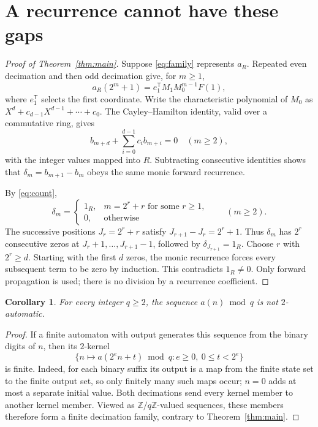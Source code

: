 \documentclass[11pt]{article}
\newtheorem{corollary}[theorem]{Corollary}
\newcommand{\Z}{\mathbb Z}
\begin{document}
\section{A recurrence cannot have these gaps}
\begin{proof}[Proof of Theorem~\ref{thm:main}]
Suppose \eqref{eq:family} represents $a_R$. Repeated even decimation
and then odd decimation give, for $m\ge1$,
\[
 a_R(2^m+1)=e_1^{\mathsf T}M_1M_0^{m-1}F(1),
\]
where $e_1^{\mathsf T}$ selects the first coordinate.
Write the characteristic polynomial of $M_0$ as
$X^d+c_{d-1}X^{d-1}+\cdots+c_0$.
The Cayley--Hamilton identity, valid over a commutative ring, gives
\begin{equation}\label{eq:recurrence}
 b_{m+d}+\sum_{i=0}^{d-1}c_i b_{m+i}=0\quad(m\ge2),
\end{equation}
with the integer values mapped into $R$.
Subtracting consecutive identities shows that
$\delta_m=b_{m+1}-b_m$ obeys the same monic forward recurrence.

By \eqref{eq:count},
\[
 \delta_m=
 \begin{cases}
  1_R,&m=2^r+r\text{ for some }r\ge1,\\
  0,&\text{otherwise}
 \end{cases}
 \qquad(m\ge2).
\]
The successive positions $J_r=2^r+r$ satisfy
$J_{r+1}-J_r=2^r+1$. Thus $\delta_m$ has $2^r$ consecutive zeros
at $J_r+1,\ldots,J_{r+1}-1$, followed by $\delta_{J_{r+1}}=1_R$.
Choose $r$ with $2^r\ge d$. Starting with the first $d$ zeros,
the monic recurrence forces every subsequent term to be zero by
induction. This contradicts $1_R\ne0$. Only forward propagation is used;
there is no division by a recurrence coefficient.
\end{proof}

\begin{corollary}\label{cor:automatic}
For every integer $q\ge2$, the sequence $a(n)\bmod q$ is not
$2$-automatic.
\end{corollary}
\begin{proof}
If a finite automaton with output generates this sequence from the binary
digits of $n$, then its $2$-kernel
\[
 \{n\mapsto a(2^e n+t)\bmod q:e\ge0,\ 0\le t<2^e\}
\]
is finite. Indeed, for each binary suffix its output is a map from the
finite state set to the finite output set, so only finitely many such
maps occur; $n=0$ adds at most a separate initial value. Both decimations
send every kernel member to another kernel member. Viewed as
$\Z/q\Z$-valued sequences, these members therefore form a finite
decimation family, contrary to Theorem~\ref{thm:main}.
\end{proof}
\end{document}
